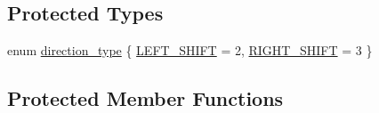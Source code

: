 \subsection*{Protected Types}
\begin{DoxyCompactItemize}
\item 
enum \mbox{\hyperlink{classratio__cut__partition_a8e2de20fc9f5cbe941aefa1c21c9b5ca}{direction\+\_\+type}} \{ \mbox{\hyperlink{classratio__cut__partition_a8e2de20fc9f5cbe941aefa1c21c9b5caa286b78408a1c94c92f841b80313428e7}{L\+E\+F\+T\+\_\+\+S\+H\+I\+FT}} = 2, 
\mbox{\hyperlink{classratio__cut__partition_a8e2de20fc9f5cbe941aefa1c21c9b5caa94c4c2223116686ce19e42cf4ccbe511}{R\+I\+G\+H\+T\+\_\+\+S\+H\+I\+FT}} = 3
 \}
\end{DoxyCompactItemize}
\subsection*{Protected Member Functions}
